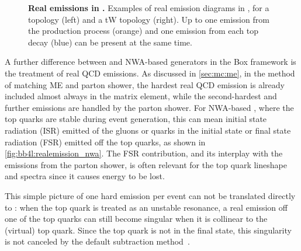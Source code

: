 \begin{figure}[th]
    \caption{\textbf{Real emissions in \bbfourl.} Examples of real emission diagrams in \bbfourl, for a \ttbar topology (left) and a tW topology (right). Up to one emission from the production process (orange) and one emission from each top decay (blue) can be present at the same time.}
    \label{fig:bb4l:realemission_bb4l}
\end{figure}

A further difference between \bbfourl and NWA-based \ttbar generators in the \powheg Box framework is the treatment of real QCD emissions. As discussed in \cref{sec:mc:me}, in the \powheg method of matching ME and parton shower, the hardest real QCD emission is already included almost always in the matrix element, while the second-hardest and further emissions are handled by the parton shower. For NWA-based \ttbar, where the top quarks are stable during event generation, this can mean initial state radiation (ISR) emitted of the gluons or quarks in the initial state or final state radiation (FSR) emitted off the top quarks, as shown in \cref{fig:bb4l:realemission_nwa}. The FSR contribution, and its interplay with the emissions from the parton shower, is often relevant for the top quark lineshape and \pt spectra since it causes energy to be lost.

This simple picture of one hard emission per event can not be translated directly to {\bbfourl}: when the top quark is treated as an unstable resonance, a real emission off one of the top quarks can still become singular when it is collinear to the (virtual) top quark. Since the top quark is not in the final state, this singularity is not canceled by the default \powheg subtraction method~\cite{Jezo:2015aia}.

